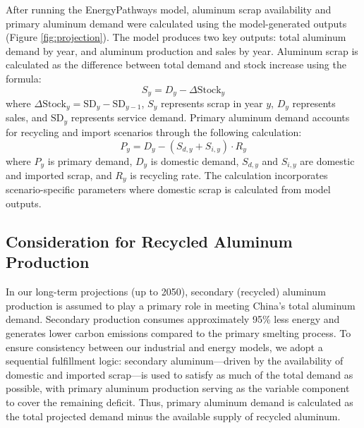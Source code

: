 \documentclass[preprint,12pt]{elsarticle}
\begin{document}
After running the EnergyPathways model, aluminum scrap availability and primary aluminum demand were calculated using the model-generated outputs (Figure \ref{fig:projection}). The model produces two key outputs: total aluminum demand by year, and aluminum production and sales by year. Aluminum scrap is calculated as the difference between total demand and stock increase using the formula:
\begin{equation}
S_y = D_y - \Delta\text{Stock}_y
\end{equation}
where $\Delta\text{Stock}_y = \text{SD}_y - \text{SD}_{y-1}$, $S_y$ represents scrap in year $y$, $D_y$ represents sales, and $\text{SD}_y$ represents service demand.
Primary aluminum demand accounts for recycling and import scenarios through the following calculation:
\begin{equation}
P_y = D_y - (S_{d,y} + S_{i,y}) \cdot R_y
\end{equation}
where $P_y$ is primary demand, $D_y$ is domestic demand, $S_{d,y}$ and $S_{i,y}$ are domestic and imported scrap, and $R_y$ is recycling rate.
The calculation incorporates scenario-specific parameters where domestic scrap is calculated from model outputs.

\subsection{Consideration for Recycled Aluminum Production}\label{recycled_operation}


In our long-term projections (up to 2050), secondary (recycled) aluminum production is assumed to play a primary role in meeting China's total aluminum demand. Secondary production consumes approximately 95\% less energy and generates lower carbon emissions compared to the primary smelting process. To ensure consistency between our industrial and energy models, we adopt a sequential fulfillment logic: secondary aluminum—driven by the availability of domestic and imported scrap—is used to satisfy as much of the total demand as possible, with primary aluminum production serving as the variable component to cover the remaining deficit. Thus, primary aluminum demand is calculated as the total projected demand minus the available supply of recycled aluminum.
\end{document}

